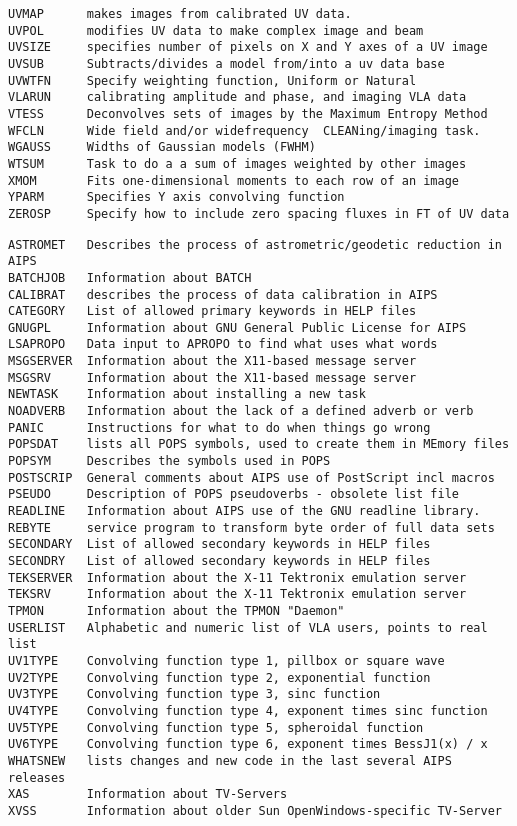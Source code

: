 \begin{verbatim}
UVMAP      makes images from calibrated UV data.
UVPOL      modifies UV data to make complex image and beam
UVSIZE     specifies number of pixels on X and Y axes of a UV image
UVSUB      Subtracts/divides a model from/into a uv data base
UVWTFN     Specify weighting function, Uniform or Natural
VLARUN     calibrating amplitude and phase, and imaging VLA data
VTESS      Deconvolves sets of images by the Maximum Entropy Method
WFCLN      Wide field and/or widefrequency  CLEANing/imaging task.
WGAUSS     Widths of Gaussian models (FWHM)
WTSUM      Task to do a a sum of images weighted by other images
XMOM       Fits one-dimensional moments to each row of an image
YPARM      Specifies Y axis convolving function
ZEROSP     Specify how to include zero spacing fluxes in FT of UV data
\end{verbatim}\eve


\vskip 0.5pt
\bbve\begin{verbatim}
ASTROMET   Describes the process of astrometric/geodetic reduction in AIPS
BATCHJOB   Information about BATCH
CALIBRAT   describes the process of data calibration in AIPS
CATEGORY   List of allowed primary keywords in HELP files
GNUGPL     Information about GNU General Public License for AIPS
LSAPROPO   Data input to APROPO to find what uses what words
MSGSERVER  Information about the X11-based message server
MSGSRV     Information about the X11-based message server
NEWTASK    Information about installing a new task
NOADVERB   Information about the lack of a defined adverb or verb
PANIC      Instructions for what to do when things go wrong
POPSDAT    lists all POPS symbols, used to create them in MEmory files
POPSYM     Describes the symbols used in POPS
POSTSCRIP  General comments about AIPS use of PostScript incl macros
PSEUDO     Description of POPS pseudoverbs - obsolete list file
READLINE   Information about AIPS use of the GNU readline library.
REBYTE     service program to transform byte order of full data sets
SECONDARY  List of allowed secondary keywords in HELP files
SECONDRY   List of allowed secondary keywords in HELP files
TEKSERVER  Information about the X-11 Tektronix emulation server
TEKSRV     Information about the X-11 Tektronix emulation server
TPMON      Information about the TPMON "Daemon"
USERLIST   Alphabetic and numeric list of VLA users, points to real list
UV1TYPE    Convolving function type 1, pillbox or square wave
UV2TYPE    Convolving function type 2, exponential function
UV3TYPE    Convolving function type 3, sinc function
UV4TYPE    Convolving function type 4, exponent times sinc function
UV5TYPE    Convolving function type 5, spheroidal function
UV6TYPE    Convolving function type 6, exponent times BessJ1(x) / x
WHATSNEW   lists changes and new code in the last several AIPS releases
XAS        Information about TV-Servers
XVSS       Information about older Sun OpenWindows-specific TV-Server
\end{verbatim}\eve

